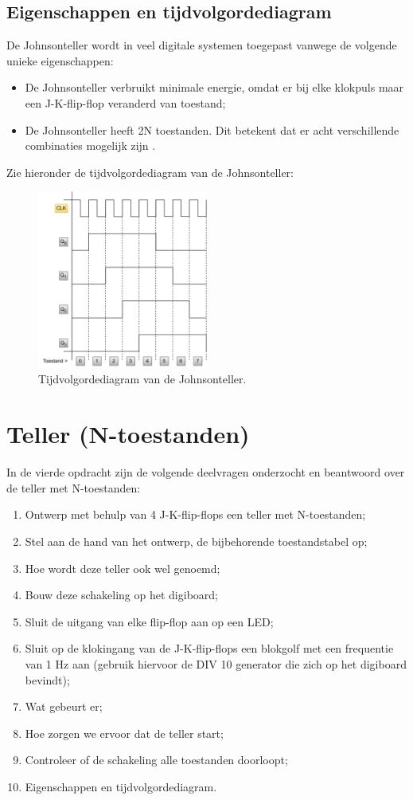\documentclass[12pt]{article}
\begin{document}
\subsection{Eigenschappen en tijdvolgordediagram}
De Johnsonteller wordt in veel digitale systemen toegepast vanwege de volgende unieke eigenschappen:
\begin{itemize}
    \item De Johnsonteller verbruikt minimale energie, omdat er bij elke klokpuls maar een J-K-flip-flop veranderd van toestand;
    \item De Johnsonteller heeft 2N toestanden. Dit betekent dat er acht verschillende combinaties mogelijk zijn \cite{schuifregister}.
\end{itemize}
Zie hieronder de tijdvolgordediagram van de Johnsonteller:
\begin{figure}[h]
    \centering
    \includegraphics[width=0.5\textwidth]{tijd2.png}
    \caption{Tijdvolgordediagram van de Johnsonteller.}
    \label{fig:johsn113}
\end{figure} 
\pagebreak
\section{Teller (N-toestanden)}
In de vierde opdracht zijn de volgende deelvragen onderzocht en beantwoord over de teller met N-toestanden:
\begin{enumerate}
    \item Ontwerp met behulp van 4 J-K-flip-flops een teller met N-toestanden;
    \item Stel aan de hand van het ontwerp, de bijbehorende toestandstabel op;
    \item Hoe wordt deze teller ook wel genoemd;
    \item Bouw deze schakeling op het digiboard;
    \item Sluit de uitgang van elke flip-flop aan op een LED;
    \item Sluit op de klokingang van de J-K-flip-flops een blokgolf met een frequentie van 1 Hz aan (gebruik hiervoor de DIV 10 generator die zich op het digiboard bevindt);
    \item Wat gebeurt er;
    \item Hoe zorgen we ervoor dat de teller start;
    \item Controleer of de schakeling alle toestanden doorloopt;
    \item Eigenschappen en tijdvolgordediagram.
\end{enumerate}
\pagebreak
\end{document}
